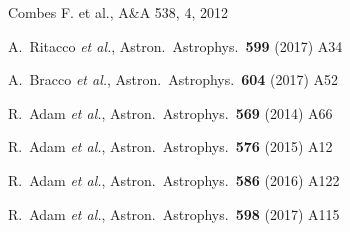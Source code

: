 \begin{thebibliography}{99}
 Combes F. et al., A\&A 538, 4, 2012
  
 
  A.~Ritacco {\it et al.},
  Astron.\ Astrophys.\  {\bf 599} (2017) A34
  
  A.~Bracco {\it et al.},
  Astron.\ Astrophys.\  {\bf 604} (2017) A52


  R.~Adam {\it et al.},
  Astron.\ Astrophys.\  {\bf 569} (2014) A66
  

  R.~Adam {\it et al.},
  Astron.\ Astrophys.\  {\bf 576} (2015) A12
  


  R.~Adam {\it et al.},
  Astron.\ Astrophys.\  {\bf 586} (2016) A122
  
  
  R.~Adam {\it et al.},
  Astron.\ Astrophys.\  {\bf 598} (2017) A115




\end{thebibliography}
